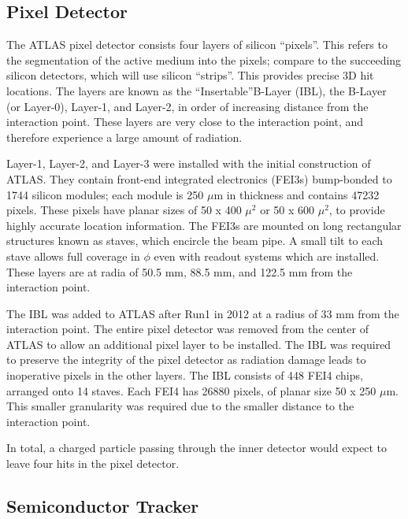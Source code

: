 \subsection{Pixel Detector}

The ATLAS pixel detector consists four layers of silicon ``pixels''.
This refers to the segmentation of the active medium into the pixels; compare to the succeeding silicon detectors, which will use silicon ``strips''.
This provides precise 3D hit locations.
The layers are known as the ``Insertable''\footnotemark B-Layer (IBL), the B-Layer (or Layer-0), Layer-1, and Layer-2, in order of increasing distance from the interaction point.
These layers are very close to the interaction point, and therefore experience a large amount of radiation.

Layer-1, Layer-2, and Layer-3 were installed with the initial construction of ATLAS.
They contain front-end integrated electronics (FEI3s) bump-bonded to 1744 silicon modules; each module is 250 $\mu$m in thickness and contains 47232 pixels.
These pixels have planar sizes of 50 x 400 $\mu^2$ or  50 x 600 $\mu^2$, to provide highly accurate location information.
The FEI3s are mounted on long rectangular structures known as staves, which encircle the beam pipe.
A small tilt to each stave allows full coverage in $\phi$ even with readout systems which are installed.
These layers are at radia of 50.5 mm, 88.5 mm, and 122.5 mm from the interaction point.

The IBL was added to ATLAS after Run1 in 2012 at a radius of 33 mm from the interaction point.
The entire pixel detector was removed from the center of ATLAS to allow an additional pixel layer to be installed.
The IBL was required to preserve the integrity of the pixel detector as radiation damage leads to inoperative pixels in the other layers.
The IBL consists of 448 FEI4 chips, arranged onto 14 staves.
Each FEI4 has 26880 pixels, of planar size 50 x 250 $\mu$m.
This smaller granularity was required due to the smaller distance to the interaction point.

In total, a charged particle passing through the inner detector would expect to leave four hits in the pixel detector.

\subsection{Semiconductor Tracker}

